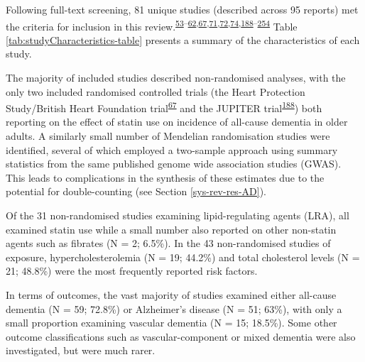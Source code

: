 \documentclass[a4paper, twoside]{templates/ociamthesis}
\begin{document}
Following full-text screening, 81 unique studies (described across 95 reports) met the criteria for inclusion in this review.\textsuperscript{\protect\hyperlink{ref-kivipelto2005}{53}--\protect\hyperlink{ref-reitz2004}{62},\protect\hyperlink{ref-heartprotectionstudycollaborativegroup2002}{67},\protect\hyperlink{ref-larsson2017}{71},\protect\hyperlink{ref-ostergaard2015}{72},\protect\hyperlink{ref-benn2017}{74},\protect\hyperlink{ref-ridker2008}{188}--\protect\hyperlink{ref-zhu2018}{254}} Table \ref{tab:studyCharacteristics-table} presents a summary of the characteristics of each study.

The majority of included studies described non-randomised analyses, with the only two included randomised controlled trials (the Heart Protection Study/British Heart Foundation trial\textsuperscript{\protect\hyperlink{ref-heartprotectionstudycollaborativegroup2002}{67}} and the JUPITER trial\textsuperscript{\protect\hyperlink{ref-ridker2008}{188}}) both reporting on the effect of statin use on incidence of all-cause dementia in older adults. A similarly small number of Mendelian randomisation studies were identified, several of which employed a two-sample approach using summary statistics from the same published genome wide association studies (GWAS). This leads to complications in the synthesis of these estimates due to the potential for double-counting (see Section \ref{sys-rev-res-AD}).

Of the 31 non-randomised studies examining lipid-regulating agents (LRA), all examined statin use while a small number also reported on other non-statin agents such as fibrates (N = 2; 6.5\%). In the 43 non-randomised studies of exposure, hypercholesterolemia (N = 19; 44.2\%) and total cholesterol levels (N = 21; 48.8\%) were the most frequently reported risk factors.

In terms of outcomes, the vast majority of studies examined either all-cause dementia (N = 59; 72.8\%) or Alzheimer's disease (N = 51; 63\%), with only a small proportion examining vascular dementia (N = 15; 18.5\%). Some other outcome classifications such as vascular-component or mixed dementia were also investigated, but were much rarer.
\end{document}
